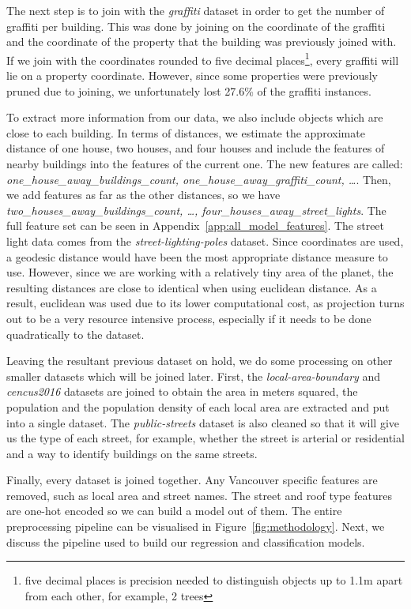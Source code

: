 The next step is to join with the \textit{graffiti} dataset in order to get the number of graffiti per building. This was done by joining on the coordinate of the graffiti and the coordinate of the property that the building was previously joined with. If we join with the coordinates rounded to five decimal places\footnote{five decimal places is precision needed to distinguish objects up to 1.1m apart from each other, for example, 2 trees}, every graffiti will lie on a property coordinate. However, since some properties were previously pruned due to joining, we unfortunately lost 27.6\% of the graffiti instances.

To extract more information from our data, we also include objects which are close to each building. In terms of distances, we estimate the approximate distance of one house, two houses, and four houses and include the features of nearby buildings into the features of the current one. The new features are called: \textit{one\_house\_away\_buildings\_count, one\_house\_away\_graffiti\_count, \ldots}. Then, we add features as far as the other distances, so we have \textit{two\_houses\_away\_buildings\_count, \ldots, four\_houses\_away\_street\_lights}. The full feature set can be seen in Appendix~\ref{app:all_model_features}. The street light data comes from the \textit{street-lighting-poles} dataset. Since coordinates are used, a geodesic distance would have been the most appropriate distance measure to use. However, since we are working with a relatively tiny area of the planet, the resulting distances are close to identical when using euclidean distance. As a result, euclidean was used due to its lower computational cost, as projection turns out to be a very resource intensive process, especially if it needs to be done quadratically to the dataset.

Leaving the resultant previous dataset on hold, we do some processing on other smaller datasets which will be joined later. First, the \textit{local-area-boundary} and \textit{cencus2016} datasets are joined to obtain the area in meters squared, the population and the population density of each local area are extracted and put into a single dataset. The \textit{public-streets} dataset is also cleaned so that it will give us the type of each street, for example, whether the street is arterial or residential and a way to identify buildings on the same streets.

Finally, every dataset is joined together. Any Vancouver specific features are removed, such as local area and street names. The street and roof type features are one-hot encoded so we can build a model out of them. The entire preprocessing pipeline can be visualised in Figure~\ref{fig:methodology}. Next, we discuss the pipeline used to build our regression and classification models.

